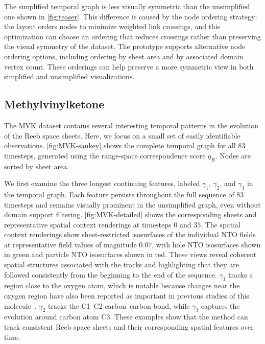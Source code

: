 \documentclass[review]{vgtc}                          %
\begin{document}
The simplified temporal graph is less visually symmetric than the unsimplified one shown in \autoref{fig:teaser}. This difference is caused by the node ordering strategy: the layout orders nodes to minimize weighted link crossings, and this optimization can choose an ordering that reduces crossings rather than preserving the visual symmetry of the dataset. The prototype supports alternative node ordering options, including ordering by sheet area and by associated domain vertex count. These orderings can help preserve a more symmetric view in both simplified and unsimplified visualizations.




\subsection{Methylvinylketone}

The MVK dataset contains several interesting temporal patterns in the evolution of the Reeb space sheets. Here, we focus on a small set of easily identifiable observations. \autoref{fig:MVK-sankey} shows the complete temporal graph for all $83$ timesteps, generated using the range-space correspondence score $q_R$. Nodes are sorted by sheet area.

We first examine the three longest continuing features, labeled $\gamma_1$, $\gamma_2$, and $\gamma_3$ in the temporal graph. Each feature persists throughout the full sequence of $83$ timesteps and remains visually prominent in the unsimplified graph, even without domain support filtering. \autoref{fig:MVK-detailed} shows the corresponding sheets and representative spatial context renderings at timesteps $0$ and $35$. The spatial context renderings show sheet-restricted isosurfaces of the individual NTO fields at representative field values of magnitude $0.07$, with hole NTO isosurfaces shown in green and particle NTO isosurfaces shown in red. These views reveal coherent spatial structures associated with the tracks and highlighting that they are followed consistently from the beginning to the end of the sequence. $\gamma_1$ tracks a region close to the oxygen atom, which is notable because changes near the oxygen region have also been reported as important in previous studies of this molecule~\cite{Sharma2025}. $\gamma_2$ tracks the C1--C2 carbon--carbon bond, while $\gamma_3$ captures the evolution around carbon atom C3. These examples show that the method can track consistent Reeb space sheets and their corresponding spatial features over time.
\end{document}
